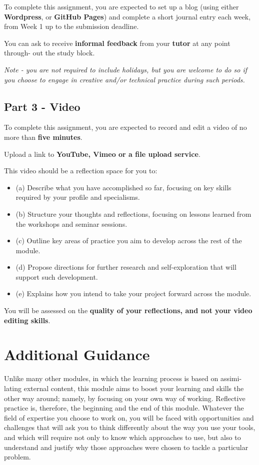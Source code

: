 \documentclass{../../fal_assignment}
\begin{document}
To complete this assignment, you are expected to set up a blog (using either \textbf{Wordpress}, or \textbf{GitHub Pages}) and complete a short journal entry each week, from Week 1 up to the submission deadline.

You can ask to receive \textbf{informal feedback} from your \textbf{tutor} at any point through- out the study block.

\emph{Note - you are not required to include holidays, but you are welcome to do so if you choose to engage in creative and/or technical practice during such periods.}

\pagebreak

\subsection*{Part 3 - Video} 

To complete this assignment, you are expected to record and edit a video of no more than \textbf{five minutes}. 

Upload a link to \textbf{YouTube, Vimeo or a file upload service}.

This video should be a reflection space for you to:
\begin{itemize}
\item(a) Describe what you have accomplished so far, focusing on key skills required by your profile and specialisms.
\item(b) Structure your thoughts and reflections, focusing on lessons learned from the workshops and seminar sessions.
\item(c) Outline key areas of practice you aim to develop across the rest of the module.
\item(d) Propose directions for further research and self-exploration that will support such development.
\item(e) Explains how you intend to take your project forward across the module.
\end{itemize}
You will be assessed on the \textbf{quality of your reflections, and not your video editing skills}.

\section*{Additional Guidance}

Unlike many other modules, in which the learning process is based on assimi- lating external content, this module aims to boost your learning and skills the other way around; namely, by focusing on your own way of working. Reflective practice is, therefore, the beginning and the end of this module. Whatever the field of expertise you choose to work on, you will be faced with opportunities and challenges that will ask you to think differently about the way you use your tools, and which will require not only to know which approaches to use, but also to understand and justify why those approaches were chosen to tackle a particular problem.
\end{document}

